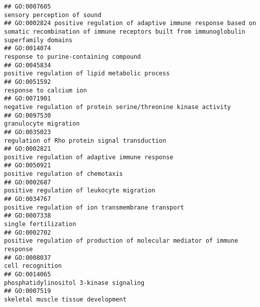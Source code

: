 \documentclass[
]{article}
\begin{document}
\begin{verbatim}
## GO:0007605                                                                                                                      sensory perception of sound
## GO:0002824 positive regulation of adaptive immune response based on somatic recombination of immune receptors built from immunoglobulin superfamily domains
## GO:0014074                                                                                                           response to purine-containing compound
## GO:0045834                                                                                                   positive regulation of lipid metabolic process
## GO:0051592                                                                                                                          response to calcium ion
## GO:0071901                                                                                  negative regulation of protein serine/threonine kinase activity
## GO:0097530                                                                                                                            granulocyte migration
## GO:0035023                                                                                                    regulation of Rho protein signal transduction
## GO:0002821                                                                                                  positive regulation of adaptive immune response
## GO:0050921                                                                                                                positive regulation of chemotaxis
## GO:0002687                                                                                                       positive regulation of leukocyte migration
## GO:0034767                                                                                               positive regulation of ion transmembrane transport
## GO:0007338                                                                                                                             single fertilization
## GO:0002702                                                                       positive regulation of production of molecular mediator of immune response
## GO:0008037                                                                                                                                 cell recognition
## GO:0014065                                                                                                          phosphatidylinositol 3-kinase signaling
## GO:0007519                                                                                                               skeletal muscle tissue development

\end{verbatim}
\end{document}

